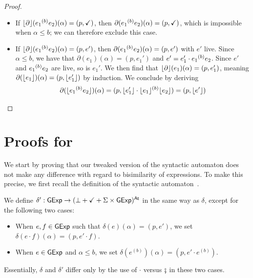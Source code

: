 \documentclass[orivec,envcountsect,envcountsame]{llncs}
\begin{document}
\begin{proof}
\begin{itemize}
\begin{itemize}
\begin{itemize}
				\item
				If $\partial(e_1 \while{b} e_2)(\alpha) = (p, e')$ with $e'$ dead, then since $\alpha \leq b$ we must have that $e' = e_1' \cdot e_1 \while{b} e_2$, with $\partial(e_1)(\alpha) = (p, e_1')$.
				Since $\overline{b}e_2$ is live, so is $e_1 \while{b} e_2$.
				It then follows that $e_1'$ is dead, and so $\floor{\partial}(e_1)(\alpha) = \bot$.
				By induction, $\partial(\floor{e_1})(\alpha) = \bot$, meaning that $\partial(\floor{e_1 \while{b} e_2})(\alpha) = \bot$.
			\end{itemize}

			\item
			If $\lfloor\partial\rfloor(e_1 {\mathbin{^{(b)}}} e_2)(\alpha) = (p, \checkmark)$, then $\partial(e_1 {\mathbin{^{(b)}}} e_2)(\alpha) = (p, \checkmark)$, which is impossible when $\alpha \leq b$; we can therefore exclude this case.

			\item
			If $\lfloor\partial\rfloor(e_1 {\mathbin{^{(b)}}} e_2)(\alpha) = (p, e')$, then $\partial(e_1 \while{b} e_2)(\alpha) = (p, e')$ with $e'$ live.
			Since $\alpha \leq b$, we have that $\partial(e_1)(\alpha) = (p, e_1')$ and $e' = e_1' \cdot e_1 \while{b} e_2$.
			Since $e'$ and $e_1 \while{b} e_2$ are live, so is $e_1'$.
			We then find that $\lfloor\partial\rfloor(e_1)(\alpha) = (p, e_1')$, meaning $\partial(\lfloor e_1\rfloor)(\alpha) = (p, \lfloor e_1'\rfloor)$ by induction.
			We conclude by deriving
			\[
			\partial(\lfloor e_1 {\mathbin{^{(b)}}} e_2\rfloor)(\alpha)
			= (p, \lfloor e_1'\rfloor \cdot \lfloor e_1\rfloor {\mathbin{^{(b)}}} \lfloor e_2\rfloor)
			= (p, \lfloor e'\rfloor)
			\]
		\end{itemize}
	\end{itemize}
\end{proof}

\section{Proofs for }%
\label{appendix:relation to GKAT}

We start by proving that our tweaked version of the syntactic \GKAT automaton does not make any difference with regard to bisimilarity of expressions.
To make this precise, we first recall the definition of the syntactic \GKAT automaton~\cite{gkaticalp}.
\begin{definition}
	We define $\delta': \mathsf{GExp} \to (\bot + \checkmark + \Sigma \times \mathsf{GExp})^{\mathsf{At}}$ in the same way as $\delta$, except for the following two cases:
	\begin{itemize}
		\item
		When $e, f \in \mathsf{GExp}$ such that $\delta(e)(\alpha) = (p, e')$, we set $\delta(e \cdot f)(\alpha) = (p, e' \cdot f)$.
		\item
		When $e \in \mathsf{GExp}$ and $\alpha \leq b$, we set $\delta(e^{(b)})(\alpha) = (p, e' \cdot e^{(b)})$.
	\end{itemize}
	Essentially, $\delta$ and $\delta'$ differ only by the use of $\cdot$ versus $\fatsemi$ in these two cases.
\end{definition}
\end{document}
